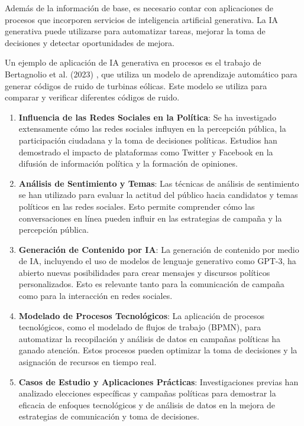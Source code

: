 \documentclass[12pt]{article}
\begin{document}
Además de la información de base, es necesario contar con aplicaciones de procesos que incorporen servicios de inteligencia artificial generativa. La IA generativa puede utilizarse para automatizar tareas, mejorar la toma de decisiones y detectar oportunidades de mejora.

Un ejemplo de aplicación de IA generativa en procesos es el trabajo de Bertagnolio et al. (2023) \cite{bertagnolio2023}, que utiliza un modelo de aprendizaje automático para generar códigos de ruido de turbinas eólicas. Este modelo se utiliza para comparar y verificar diferentes códigos de ruido.


\begin{enumerate}
\item \textbf{Influencia de las Redes Sociales en la Política}: Se ha investigado extensamente cómo las redes sociales influyen en la percepción pública, la participación ciudadana y la toma de decisiones políticas. Estudios han demostrado el impacto de plataformas como Twitter y Facebook en la difusión de información política y la formación de opiniones.

\item \textbf{Análisis de Sentimiento y Temas}: Las técnicas de análisis de sentimiento se han utilizado para evaluar la actitud del público hacia candidatos y temas políticos en las redes sociales. Esto permite comprender cómo las conversaciones en línea pueden influir en las estrategias de campaña y la percepción pública.

\item \textbf{Generación de Contenido por IA}: La generación de contenido por medio de IA, incluyendo el uso de modelos de lenguaje generativo como GPT-3, ha abierto nuevas posibilidades para crear mensajes y discursos políticos personalizados. Esto es relevante tanto para la comunicación de campaña como para la interacción en redes sociales.

\item \textbf{Modelado de Procesos Tecnológicos}: La aplicación de procesos tecnológicos, como el modelado de flujos de trabajo (BPMN), para automatizar la recopilación y análisis de datos en campañas políticas ha ganado atención. Estos procesos pueden optimizar la toma de decisiones y la asignación de recursos en tiempo real.

\item \textbf{Casos de Estudio y Aplicaciones Prácticas}: Investigaciones previas han analizado elecciones específicas y campañas políticas para demostrar la eficacia de enfoques tecnológicos y de análisis de datos en la mejora de estrategias de comunicación y toma de decisiones.
\end{enumerate}
\end{document}
